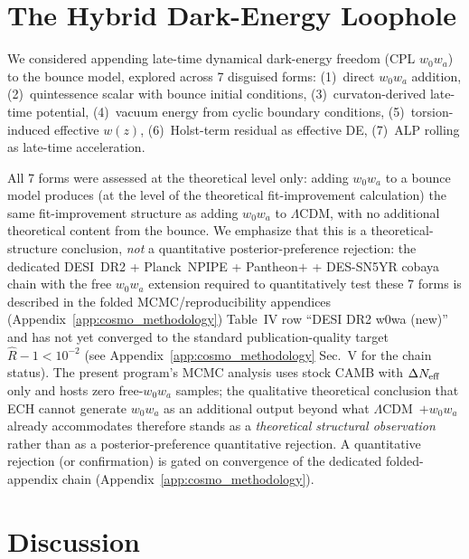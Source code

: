 \documentclass[aps,prd,twocolumn,superscriptaddress,showpacs,preprintnumbers,nofootinbib,longbibliography,floatfix]{revtex4-2}
\newcommand{\Neff}{N_{\rm eff}}
\begin{document}
\section{The Hybrid Dark-Energy Loophole}\label{sec:loophole}

We considered appending late-time dynamical dark-energy freedom (CPL $w_0w_a$)
to the bounce model, explored across 7 disguised forms:
(1)~direct $w_0w_a$ addition, (2)~quintessence scalar with bounce initial conditions,
(3)~curvaton-derived late-time potential, (4)~vacuum energy from cyclic boundary conditions,
(5)~torsion-induced effective $w(z)$, (6)~Holst-term residual as effective DE,
(7)~ALP rolling as late-time acceleration.

All 7 forms were assessed at the theoretical level only: adding $w_0w_a$ to a
bounce model produces (at the level of the theoretical fit-improvement
calculation) the same fit-improvement structure as adding $w_0w_a$ to
$\Lambda$CDM, with no additional theoretical content from the bounce. We
emphasize that this is a theoretical-structure conclusion, \emph{not} a
quantitative posterior-preference rejection: the dedicated DESI~DR2 +
Planck~NPIPE + Pantheon$+$ + DES-SN5YR cobaya chain with the free $w_0w_a$
extension required to quantitatively test these 7 forms is described in
the folded MCMC/reproducibility appendices (Appendix~\ref{app:cosmo_methodology}) Table~IV row ``DESI DR2 w0wa (new)'' and has not yet
converged to the standard publication-quality target $\hat R - 1 < 10^{-2}$
(see Appendix~\ref{app:cosmo_methodology} Sec.~V for the chain status). The
present program's MCMC analysis uses stock CAMB with $\Delta\Neff$ only and
hosts zero free-$w_0w_a$ samples; the qualitative theoretical conclusion
that ECH cannot generate $w_0w_a$ as an additional output beyond what
$\Lambda$CDM~$+w_0w_a$ already accommodates therefore stands as a
\emph{theoretical structural observation} rather than as a posterior-preference
quantitative rejection. A quantitative rejection (or confirmation) is gated
on convergence of the dedicated folded-appendix chain (Appendix~\ref{app:cosmo_methodology}).


\section{Discussion}\label{sec:discussion}
\end{document}
